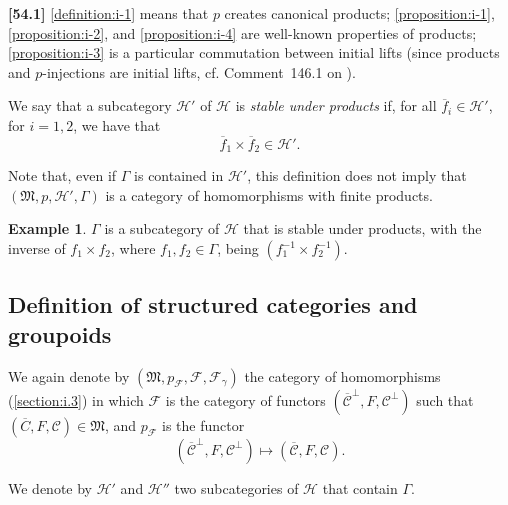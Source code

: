 \documentclass[a4paper,fleqn]{article}
\theoremstyle{plain}
\theoremstyle{definition}
\newenvironment{definition}[1]
  {\renewcommand\theinnerdefinition{#1}\innerdefinition}
  {\endinnerdefinition}
\newtheorem*{example}{Example}
\newenvironment{longcomm}[1]
  {\noindent\textbf{[#1]}\rmfamily}
  {}
\newcommand{\oldpage}[1]{{\marginpar{\footnotesize$\bigg\vert$\,\,\,\,\textit{p.~#1}}}}
\newcommand{\CC}{\mathcal{C}}
\newcommand{\HH}{\mathcal{H}}
\newcommand{\MM}{\mathfrak{M}}
\newcommand{\FF}{\mathcal{F}}
\begin{document}
\begin{longcomm}{54.1}
  \cref{definition:i-1} means that $p$ creates canonical products;
  \cref{proposition:i-1}, \cref{proposition:i-2}, and \cref{proposition:i-4} are well-known properties of products;
  \cref{proposition:i-3} is a particular commutation between initial lifts (since products and $p$-injections are initial lifts, cf. Comment~146.1 on \cite{coll66}).
\end{longcomm}

\begin{definition}{2}
\label{definition:ii-2}
  We say that a subcategory $\HH'$ of $\HH$ is \emph{stable under products} if, for all $\overline{f}_i\in\HH'$, for $i=1,2$, we have that
  \[
    \overline{f}_1\times\overline{f}_2
    \in\HH'.
  \]
\end{definition}

Note that, even if $\Gamma$ is contained in $\HH'$, this definition does not imply that $(\MM,p,\HH',\Gamma)$ is a category of homomorphisms with finite products.

\oldpage{383}
\begin{example}
  $\Gamma$ is a subcategory of $\HH$ that is stable under products, with the inverse of $f_1\times f_2$, where $f_1,f_2\in\Gamma$, being $(f_1^{-1}\times f_2^{-1})$.
\end{example}



\subsection{Definition of structured categories and groupoids}
\label{section:ii.2}

We again denote by $(\MM,p_\FF,\FF,\FF_\gamma)$ the category of homomorphisms (\cref{section:i.3}) in which $\FF$ is the category of functors $(\overline{\CC}^\perp,F,\CC^\perp)$ such that $(\overline{C},F,\CC)\in\MM$, and $p_\FF$ is the functor
\[
  (\overline{\CC}^\perp,F,\CC^\perp)
  \longmapsto (\overline{\CC},F,\CC).
\]

We denote by $\HH'$ and $\HH''$ two subcategories of $\HH$ that contain $\Gamma$.
\end{document}
